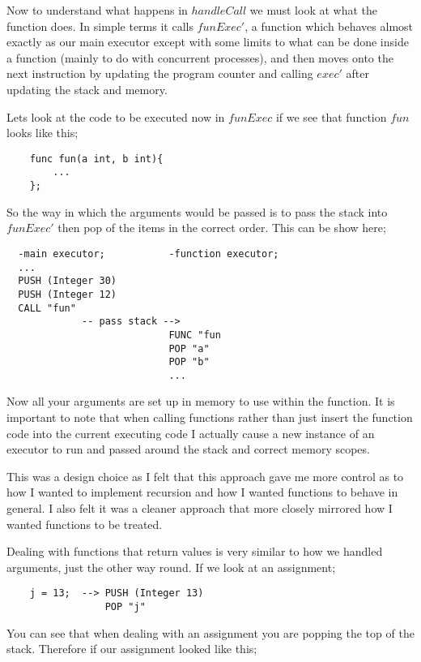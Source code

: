 Now to understand what happens in $handleCall$ we must look at what the function does. In simple terms it calls $funExec'$, a function which behaves almost exactly as our main executor except with some limits to what can be done inside a function (mainly to do with concurrent processes), and then moves onto the next instruction by updating the program counter and calling $exec'$ after updating the stack and memory. 

Lets look at the code to be executed now in $funExec$ if we see that function $fun$ looks like this;

\begin{lstlisting}
	func fun(a int, b int){
		...
	};
\end{lstlisting}

So the way in which the arguments would be passed is to pass the stack into $funExec'$ then pop of the items in the correct order. This can be show here;

\begin{lstlisting}
  -main executor;           -function executor;
  ...
  PUSH (Integer 30)
  PUSH (Integer 12)
  CALL "fun"
             -- pass stack --> 
                            FUNC "fun  
                            POP "a"
                            POP "b"
                            ...
\end{lstlisting}
  
Now all your arguments are set up in memory to use within the function. It is important to note that when calling functions rather than just insert the function code into the current executing code I actually cause a new instance of an executor to run and passed around the stack and correct memory scopes. 

This was a design choice as I felt that this approach gave me more control as to how I wanted to implement recursion and how I wanted functions to behave in general. I also felt it was a cleaner approach that more closely mirrored how I wanted functions to be treated.

Dealing with  functions that return values is very similar to how we handled arguments, just the other way round. If we look at an assignment;

\begin{lstlisting}
	j = 13;  --> PUSH (Integer 13)
	             POP "j"	
\end{lstlisting}

You can see that when dealing with an assignment you are popping the top of the stack. Therefore if our assignment looked like this;

